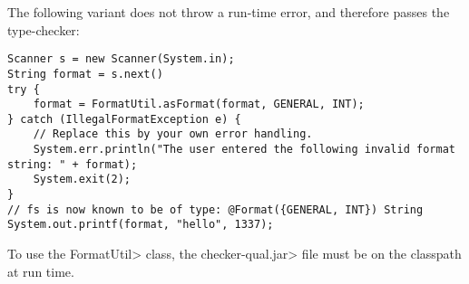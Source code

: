 \noindent The following variant does not throw a run-time error, and
therefore passes the type-checker:

\begin{Verbatim}
Scanner s = new Scanner(System.in);
String format = s.next()
try {
    format = FormatUtil.asFormat(format, GENERAL, INT);
} catch (IllegalFormatException e) {
    // Replace this by your own error handling.
    System.err.println("The user entered the following invalid format string: " + format);
    System.exit(2);
}
// fs is now known to be of type: @Format({GENERAL, INT}) String
System.out.printf(format, "hello", 1337);
\end{Verbatim}

\noindent
To use the \<FormatUtil> class, the \<checker-qual.jar> file
must be on the classpath at run time.

